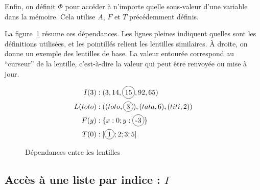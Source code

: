 Enfin, on définit $Φ$ pour accéder à n'importe quelle sous-valeur d'une variable
dans la mémoire. Cela utilise $A$, $F$ et $T$ précédemment définis.

La figure~\ref{fig:dep-lens} résume ces dépendances. Les lignes pleines
indiquent quelles sont les définitions utilisées, et les pointillés relient les
lentilles similaires. À droite, on donne un exemple des lentilles de base. La
valeur entourée correspond au \enquote{curseur} de la lentille, c'est-à-dire la
valeur qui peut être renvoyée ou mise à jour.

\begin{figure}[h]
\centering
\vspace{5mm}
\begin{minipage}[b]{0.4\textwidth}
\end{minipage}
\begin{minipage}[b]{0.5\textwidth}
\begin{align*}
I(3)     &: (3, 14, \circled{15}, 92, 65) \\
L(toto)  &: ((toto, \circled{3}), (tata, 6), (titi, 2)) \\
F(y)     &: \{ x: 0; y: \circled{-3} \} \\
T(0)     &: \eArray{\circled{1}; 2; 3; 5} \\
\end{align*}
\end{minipage}
\vspace{5mm}

\caption{Dépendances entre les lentilles}
\label{fig:dep-lens}

\end{figure}

\subsection*{Accès à une liste par indice : $I$}

